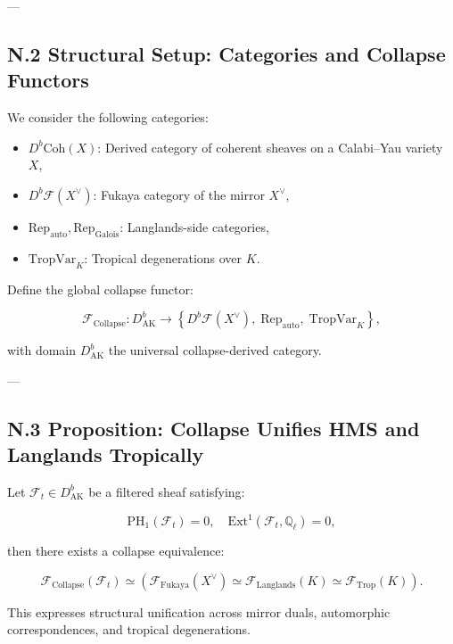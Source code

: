 \documentclass[11pt]{article}
\begin{document}
---

\subsection*{N.2 Structural Setup: Categories and Collapse Functors}

We consider the following categories:

\begin{itemize}
  \item $D^b\mathrm{Coh}(X)$: Derived category of coherent sheaves on a Calabi–Yau variety $X$,
  \item $D^b\mathcal{F}(X^\vee)$: Fukaya category of the mirror $X^\vee$,
  \item $\mathrm{Rep}_\mathrm{auto}, \mathrm{Rep}_\mathrm{Galois}$: Langlands-side categories,
  \item $\mathrm{TropVar}_K$: Tropical degenerations over $K$.
\end{itemize}

Define the global collapse functor:

\[
\mathcal{F}_{\mathrm{Collapse}} : D^b_{\mathrm{AK}} \to \left\{
D^b\mathcal{F}(X^\vee),\;
\mathrm{Rep}_\mathrm{auto},\;
\mathrm{TropVar}_K
\right\},
\]

with domain $D^b_{\mathrm{AK}}$ the universal collapse-derived category.

---

\subsection*{N.3 Proposition: Collapse Unifies HMS and Langlands Tropically}

\begin{proposition}
Let $\mathcal{F}_t \in D^b_{\mathrm{AK}}$ be a filtered sheaf satisfying:

\[
\mathrm{PH}_1(\mathcal{F}_t) = 0, \quad \mathrm{Ext}^1(\mathcal{F}_t, \mathbb{Q}_\ell) = 0,
\]

then there exists a collapse equivalence:

\[
\mathcal{F}_{\mathrm{Collapse}}(\mathcal{F}_t) \simeq
\left(
\mathcal{F}_{\mathrm{Fukaya}}(X^\vee)
\simeq
\mathcal{F}_{\mathrm{Langlands}}(K)
\simeq
\mathcal{F}_{\mathrm{Trop}}(K)
\right).
\]
\end{proposition}

This expresses structural unification across mirror duals, automorphic correspondences, and tropical degenerations.
\end{document}
